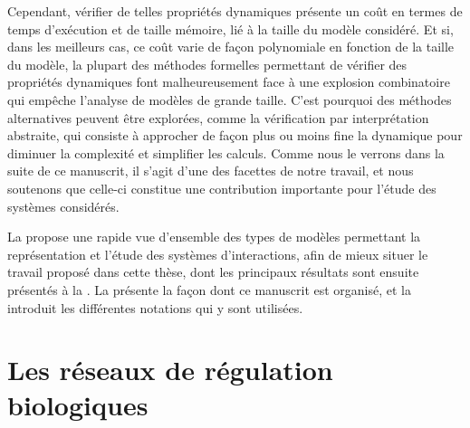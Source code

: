 Cependant, vérifier de telles propriétés dynamiques présente un coût
en termes de temps d'exécution et de taille mémoire,
lié à la taille du modèle considéré.
Et si, dans les meilleurs cas, ce coût varie de façon polynomiale
en fonction de la taille du modèle,
la plupart des méthodes formelles permettant de vérifier des propriétés dynamiques
font malheureusement face à une explosion combinatoire
qui empêche l'analyse de modèles de grande taille.
C'est pourquoi des méthodes alternatives peuvent être explorées,
comme la vérification par interprétation abstraite,
qui consiste à approcher de façon plus ou moins fine
la dynamique pour diminuer la complexité et simplifier les calculs.
Comme nous le verrons dans la suite de ce manuscrit,
il s'agit d'une des facettes de notre travail,
et nous soutenons que celle-ci constitue une contribution importante
pour l'étude des systèmes considérés.



La  propose une rapide vue d'ensemble des types de modèles permettant
la représentation et l'étude des systèmes d'interactions,
afin de mieux situer le travail proposé dans cette thèse,
dont les principaux résultats sont ensuite présentés à la .
La  présente la façon dont ce manuscrit est organisé,
et la  introduit les différentes notations qui y sont utilisées.



\section{Les réseaux de régulation biologiques}


